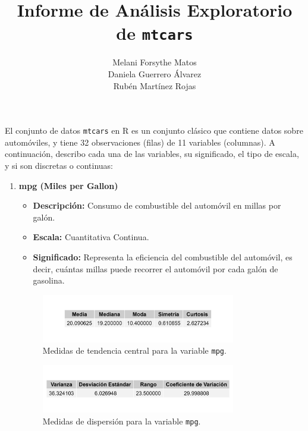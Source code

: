 \documentclass{article}
\title{Informe de Análisis Exploratorio de \texttt{mtcars}}
\author{
      Melani Forsythe Matos \\
      Daniela Guerrero Álvarez \\
      Rubén Martínez Rojas
    }
\date{} %
\begin{document}
\maketitle

\newpage %


El conjunto de datos \texttt{mtcars} en R es un conjunto clásico que contiene datos sobre automóviles, y tiene 32 observaciones (filas) de 11 variables (columnas). A continuación, describo cada una de las variables, su significado, el tipo de escala, y si son discretas o continuas:

\begin{enumerate}
	\item \textbf{mpg (Miles per Gallon)}

	      \begin{itemize}
		      \item \textbf{Descripción:} Consumo de combustible del automóvil en millas por galón.
		      \item \textbf{Escala:} Cuantitativa Continua.
		      \item \textbf{Significado:} Representa la eficiencia del combustible del automóvil, es decir, cuántas millas puede recorrer el automóvil por cada galón de gasolina.
	      \end{itemize}

	      \begin{figure}[H]
		      \centering
		      \includegraphics[width=0.8\textwidth]{MTC/mpg_central.png}
		      \caption{Medidas de tendencia central para la variable \texttt{mpg}.}
		      \label{fig:mpg_central}
	      \end{figure}

	      \begin{figure}[H]
		      \centering
		      \includegraphics[width=0.8\textwidth]{MTC/mpg_dispersion.png}
		      \caption{Medidas de dispersión para la variable \texttt{mpg}.}
		      \label{fig:mpg_dispersion}
	      \end{figure} 
	  

\end{enumerate}
\end{document}
